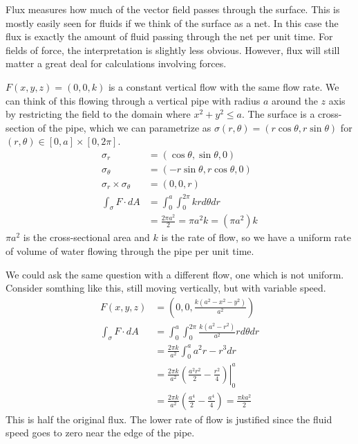 \documentclass[fleqn,letterpaper]{report}
\begin{document}
Flux measures how much of the vector field passes through the
surface. This is mostly easily seen for fluids if we think of
the surface as a net. In this case the flux is exactly the
amount of fluid passing through the net per unit time. For
fields of force, the interpretation is slightly less obvious.
However, flux will still matter a great deal for calculations
involving forces. 

\begin{example}
$F(x,y,z) = (0,0,k)$ is a constant vertical
flow with the same flow rate. We can think of this flowing
through a vertical pipe with radius $a$ around the $z$ axis by
restricting the field to the domain where $x^2 + y^2 \leq a$.
The surface is a cross-section of the pipe, which we can
parametrize as $\sigma(r,\theta) = (r \cos \theta, r \sin
\theta )$ for $(r,\theta) \in [0,a] \times [0,2\pi]$. 
\begin{align*}
\sigma_r & = (\cos \theta, \sin \theta, 0) \\
\sigma_\theta & = (-r \sin \theta, r \cos \theta, 0) \\
\sigma_r \times \sigma_\theta & = (0, 0, r) \\
\int_\sigma F \cdot dA & = \int_0^a \int_0^{2\pi} k r d\theta
dr\\
& = \frac{2\pi a^2}{2} = \pi a^2 k = (\pi a^2) k
\end{align*}
$\pi a^2$ is the cross-sectional area and $k$ is the rate of
flow, so we have a uniform rate of volume of water flowing
through the pipe per unit time.
\end{example}

\begin{example}
We could ask the same question with a different flow, one
which is not uniform. Consider somthing like this, still
moving vertically, but with variable speed.
\begin{align*}
F(x,y,z) & = \left( 0, 0, \frac{k (a^2 - x^2 - y^2)}{a^2}
\right) \\
\int_\sigma F \cdot dA & = \int_0^a \int_0^{2\pi}
\frac{k(a^2-r^2)}{a^2} r d\theta dr \\
& = \frac{2\pi k}{a^2} \int_0^a a^2r - r^3 dr \\
& = \frac{2\pi k}{a^2} \left. \left( \frac{a^2 r^2}{2} -
\frac{r^2}{4} \right) \right|_0^a \\
& = \frac{2\pi k}{a^2} \left(\frac{a^4}{2} - \frac{a^4}{4}
\right) = \frac{\pi k a^2}{2}
\end{align*}
This is half the original flux. The lower rate of flow is
justified since the fluid speed goes to zero near the edge of
the pipe. 
\end{example}
\end{document}
